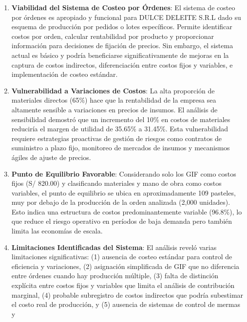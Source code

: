 \documentclass[
  stu,
  floatsintext,
  longtable,
  a4paper,
  nolmodern,
  notxfonts,
  notimes,
  12pt,
  colorlinks=true,linkcolor=blue,citecolor=blue,urlcolor=blue]{apa7}
\begin{document}
\begin{enumerate}
  una utilidad total de S/ 14,260.00 para la orden de 2,000 unidades.
  Este margen es saludable y consistente con rangos típicos de la
  industria (30-50\%), pero debe cubrir gastos administrativos, de
  ventas, financieros e impuestos no incluidos en el costo de
  producción.
\item
  \textbf{Viabilidad del Sistema de Costeo por Órdenes}: El sistema de
  costeo por órdenes es apropiado y funcional para DULCE DELEITE S.R.L
  dado su esquema de producción por pedidos o lotes específicos. Permite
  identificar costos por orden, calcular rentabilidad por producto y
  proporcionar información para decisiones de fijación de precios. Sin
  embargo, el sistema actual es básico y podría beneficiarse
  significativamente de mejoras en la captura de costos indirectos,
  diferenciación entre costos fijos y variables, e implementación de
  costeo estándar.
\item
  \textbf{Vulnerabilidad a Variaciones de Costos}: La alta proporción de
  materiales directos (65\%) hace que la rentabilidad de la empresa sea
  altamente sensible a variaciones en precios de insumos. El análisis de
  sensibilidad demostró que un incremento del 10\% en costos de
  materiales reduciría el margen de utilidad de 35.65\% a 31.45\%. Esta
  vulnerabilidad requiere estrategias proactivas de gestión de riesgos
  como contratos de suministro a plazo fijo, monitoreo de mercados de
  insumos y mecanismos ágiles de ajuste de precios.
\item
  \textbf{Punto de Equilibrio Favorable}: Considerando solo los GIF como
  costos fijos (S/ 820.00) y clasificando materiales y mano de obra como
  costos variables, el punto de equilibrio se ubica en aproximadamente
  109 pasteles, muy por debajo de la producción de la orden analizada
  (2,000 unidades). Esto indica una estructura de costos
  predominantemente variable (96.8\%), lo que reduce el riesgo operativo
  en períodos de baja demanda pero también limita las economías de
  escala.
\item
  \textbf{Limitaciones Identificadas del Sistema}: El análisis reveló
  varias limitaciones significativas: (1) ausencia de costeo estándar
  para control de eficiencia y variaciones, (2) asignación simplificada
  de GIF que no diferencia entre órdenes cuando hay producción múltiple,
  (3) falta de distinción explícita entre costos fijos y variables que
  limita el análisis de contribución marginal, (4) probable subregistro
  de costos indirectos que podría subestimar el costo real de
  producción, y (5) ausencia de sistemas de control de mermas y

\end{enumerate}
\end{document}

